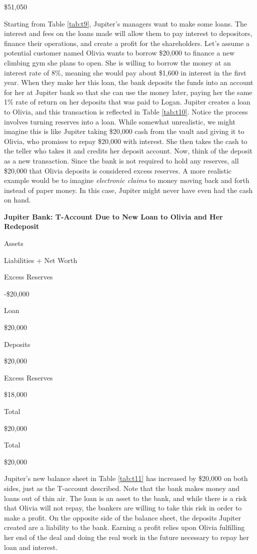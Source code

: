 \documentclass[
]{book}
\begin{document}
\$51,050

Starting from Table \ref{tab:t9}, Jupiter's managers want to make some loans. The interest and fees on the loans made will allow them to pay interest to depositors, finance their operations, and create a profit for the shareholders. Let's assume a potential customer named Olivia wants to borrow \$20,000 to finance a new climbing gym she plans to open. She is willing to borrow the money at an interest rate of 8\%, meaning she would pay about \$1,600 in interest in the first year. When they make her this loan, the bank deposits the funds into an account for her at Jupiter bank so that she can use the money later, paying her the same 1\% rate of return on her deposits that was paid to Logan. Jupiter creates a loan to Olivia, and this transaction is reflected in Table \ref{tab:t10}. Notice the process involves turning reserves into a loan. While somewhat unrealistic, we might imagine this is like Jupiter taking \$20,000 cash from the vault and giving it to Olivia, who promises to repay \$20,000 with interest. She then takes the cash to the teller who takes it and credits her deposit account. Now, think of the deposit as a new transaction. Since the bank is not required to hold any reserves, all \$20,000 that Olivia deposits is considered excess reserves. A more realistic example would be to imagine \emph{electronic claims} to money moving back and forth instead of paper money. In this case, Jupiter might never have even had the cash on hand.

\label{tab:t10}\textbf{Jupiter Bank: T-Account Due to New Loan to Olivia and Her Redeposit}

Assets

Liabilities + Net Worth

Excess Reserves

-\$20,000

Loan

\$20,000

Deposits

\$20,000

Excess Reserves

\$18,000

Total

\$20,000

Total

\$20,000

Jupiter's new balance sheet in Table \ref{tab:t11} has increased by \$20,000 on both sides, just as the T-account described. Note that the bank makes money and loans out of thin air. The loan is an asset to the bank, and while there is a risk that Olivia will not repay, the bankers are willing to take this risk in order to make a profit. On the opposite side of the balance sheet, the deposits Jupiter created are a liability to the bank. Earning a profit relies upon Olivia fulfilling her end of the deal and doing the real work in the future necessary to repay her loan and interest.
\end{document}
